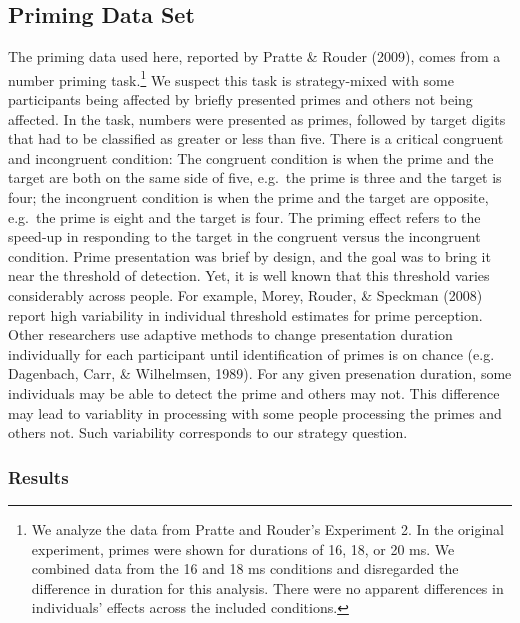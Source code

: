 \documentclass[english,man]{apa6}
\theoremstyle{definition}
\theoremstyle{definition}
\theoremstyle{remark}
\begin{document}
\subsection{Priming Data Set}\label{priming-data-set}

The priming data used here, reported by Pratte \& Rouder (2009), comes
from a number priming task.\footnote{We analyze the data from Pratte and
  Rouder's Experiment 2. In the original experiment, primes were shown
  for durations of 16, 18, or 20 ms. We combined data from the 16 and 18
  ms conditions and disregarded the difference in duration for this
  analysis. There were no apparent differences in individuals' effects
  across the included conditions.} We suspect this task is
strategy-mixed with some participants being affected by briefly
presented primes and others not being affected. In the task, numbers
were presented as primes, followed by target digits that had to be
classified as greater or less than five. There is a critical congruent
and incongruent condition: The congruent condition is when the prime and
the target are both on the same side of five, e.g.~the prime is three
and the target is four; the incongruent condition is when the prime and
the target are opposite, e.g.~the prime is eight and the target is four.
The priming effect refers to the speed-up in responding to the target in
the congruent versus the incongruent condition. Prime presentation was
brief by design, and the goal was to bring it near the threshold of
detection. Yet, it is well known that this threshold varies considerably
across people. For example, Morey, Rouder, \& Speckman (2008) report
high variability in individual threshold estimates for prime perception.
Other researchers use adaptive methods to change presentation duration
individually for each participant until identification of primes is on
chance (e.g. Dagenbach, Carr, \& Wilhelmsen, 1989). For any given
presenation duration, some individuals may be able to detect the prime
and others may not. This difference may lead to variablity in processing
with some people processing the primes and others not. Such variability
corresponds to our strategy question.

\subsubsection{Results}\label{results}
\end{document}
